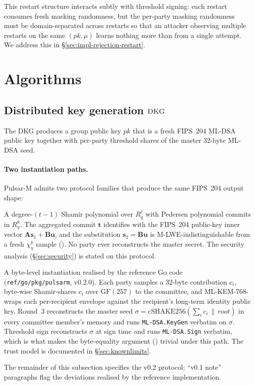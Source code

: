 \documentclass[11pt,a4paper]{article}
\theoremstyle{definition}
\theoremstyle{remark}
\newcommand{\Rq}{R_q}
\newcommand{\GF}{\mathrm{GF}}
\newcommand{\cSHAKE}{\mathrm{cSHAKE256}}
\newcommand{\DKG}{\textsc{DKG}}
\begin{document}
This restart structure interacts subtly with threshold signing: each
restart consumes fresh masking randomness, but the per-party masking
randomness must be domain-separated across restarts so that an
attacker observing multiple restarts on the same $(\mathit{pk}, \mu)$
learns nothing more than from a single attempt. We address this in
\S\ref{sec:impl-rejection-restart}.

\section{Algorithms}
\label{sec:algorithms}

\subsection{Distributed key generation \texorpdfstring{$\DKG$}{DKG}}
\label{sec:dkg}

The DKG produces a group public key $\mathit{pk}$ that is a fresh
FIPS~204 ML-DSA public key together with per-party threshold shares
of the master 32-byte ML-DSA seed.

\paragraph{Two instantiation paths.}
Pulsar-M admits two protocol families that produce the same FIPS~204
output shape:
\begin{description}[leftmargin=*, itemsep=0pt]
\item[v0.2 target (Pedersen-VSS, this section).] A degree-$(t-1)$
Shamir polynomial over $\Rq^\ell$ with Pedersen polynomial commits
in $\Rq^k$. The aggregated commit $\mathbf{t}$ identifies with the
FIPS~204 public-key inner vector $\mathbf{A}\mathbf{s}_1 +
\mathbf{B}\mathbf{u}$, and the substitution $\mathbf{s}_2 =
\mathbf{B}\mathbf{u}$ is M-LWE-indistinguishable from a fresh
$\chi_\eta^k$ sample (). No party ever reconstructs
the master secret. The security analysis (\S\ref{sec:security}) is
stated on this protocol.
\item[v0.1 reference (Path~A reconstruction aggregator).] A
byte-level instantiation realised by the reference Go code
(\texttt{ref/go/pkg/pulsarm}, v0.2.0). Each party samples a 32-byte
contribution $c_i$, byte-wise Shamir-shares $c_i$ over $\GF(257)$ to
the committee, and ML-KEM-768-wraps each per-recipient envelope
against the recipient's long-term identity public key. Round~3
reconstructs the master seed $\sigma = \cSHAKE(\sum_i c_i \,\|\,
\mathit{root})$ in every committee member's memory and runs
\texttt{ML-DSA.KeyGen} verbatim on $\sigma$. Threshold sign
reconstructs $\sigma$ at sign time and runs \texttt{ML-DSA.Sign}
verbatim, which is what makes the byte-equality argument
() trivial under this path. The trust model is
documented in \S\ref{sec:knownlimits}.
\end{description}
The remainder of this subsection specifies the v0.2 protocol;
``v0.1 note'' paragraphs flag the deviations realised by the reference
implementation.
\end{document}
